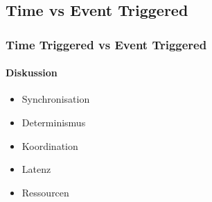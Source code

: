 \subsection{Time vs Event Triggered}
\begin{frame}
  \frametitle{Time Triggered vs Event Triggered}
  \framesubtitle{Diskussion}
  \begin{itemize}
    \item Synchronisation
    \item Determinismus
    \item Koordination
    \item Latenz
    \item Ressourcen 
  \end{itemize}
\end{frame}
